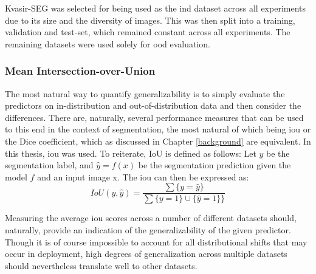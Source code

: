    Kvasir-SEG was selected for being used as the \gls{ind} dataset across all experiments due to its size and the diversity of images. This was then split into a training, validation and test-set, which remained constant across all experiments. The remaining datasets were used solely for \gls{ood} evaluation.
    
    
    \subsubsection{Mean Intersection-over-Union}
    
    The most natural way to quantify generalizability is to simply evaluate the predictors on in-distribution and out-of-distribution data and then consider the differences. There are, naturally, several performance measures that can be used to this end in the context of segmentation, the most natural of which being \gls{iou} or the Dice coefficient, which as discussed in Chapter \ref{background} are equivalent. In this thesis, \gls{iou} was used. To reiterate, IoU is defined as follows:
    Let \(y\) be the segmentation label, and \(\hat{y}=f(x)\) be the segmentation prediction given the model \(f\) and an input image x. The \gls{iou} can then be expressed as: 
    \begin{equation*}
        IoU(y, \hat{y}) = \frac{\sum \{y=\hat{y}\} }{\sum \{y=1\} \cup \{\hat{y}=1\}\}}
    \end{equation*}
    
    Measuring the average \gls{iou} scores across a number of different datasets should, naturally, provide an indication of the generalizability of the given predictor. Though it is of course impossible to account for all distributional shifts that may occur in deployment, high degrees of generalization across multiple datasets should nevertheless translate well to other datasets. 
    
    
    

